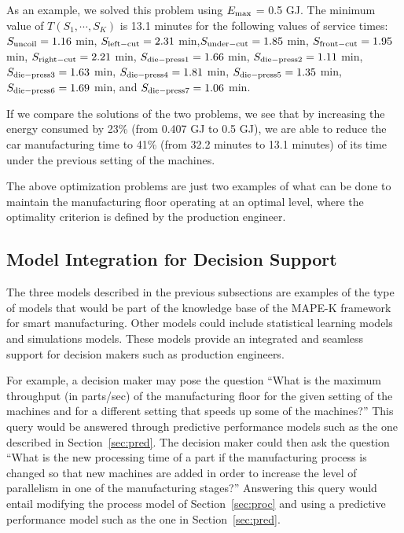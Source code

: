 \documentclass[a4paper, 12pt]{article} %
\begin{document}


As an example, we solved this problem using $E_{\rm max}$ = 0.5 GJ. The minimum value of   $T (S_1, \cdots, S_K)$ is 13.1 minutes for the following values of service times: $S_{\rm uncoil} = 1.16$ min, $S_{\rm left-cut} = 2.31$ min,$S_{\rm under-cut} = 1.85$ min, $S_{\rm front-cut} = 1.95$ min, $S_{\rm right-cut} = 2.21$ min, $S_{\rm die-press1} = 1.66$ min, $S_{\rm die-press2} = 1.11$ min, $S_{\rm die-press3} = 1.63$ min, $S_{\rm die-press4} = 1.81$ min, $S_{\rm die-press5} = 1.35$ min, $S_{\rm die-press6} = 1.69$ min,  and $S_{\rm die-press7} = 1.06$ min.

If we compare the solutions of the two problems, we see that by increasing the energy consumed by 23\% (from 0.407 GJ to 0.5 GJ), we are able to reduce the car manufacturing time to 41\% (from 32.2 minutes to 13.1 minutes) of its
time under the previous setting of the machines.

The above optimization problems are just two examples of what can be done to maintain the manufacturing floor operating at an optimal level, where the optimality criterion is defined by the production engineer.

\subsection{Model Integration for Decision Support}

The three models described in the previous subsections are examples of the type of models that would be part of the knowledge base of the MAPE-K framework for smart manufacturing. Other models could include statistical learning models and simulations models. These models provide an integrated and  seamless support for decision makers such as production engineers.

For example, a decision maker may pose the question ``What is the maximum throughput (in parts/sec) of the manufacturing floor for the given setting of the machines and for a different setting that speeds up some of the machines?''
This query would be answered through predictive performance models such as the one described in Section~\ref{sec:pred}. The decision maker could then ask the question ``What is the new processing time of a part if the manufacturing process is changed so that new machines are added in order to increase the level of parallelism in one of the manufacturing stages?'' Answering this query would entail  modifying the process model of Section~\ref{sec:proc} and using a predictive performance model such as the one in Section~\ref{sec:pred}.
\end{document}
